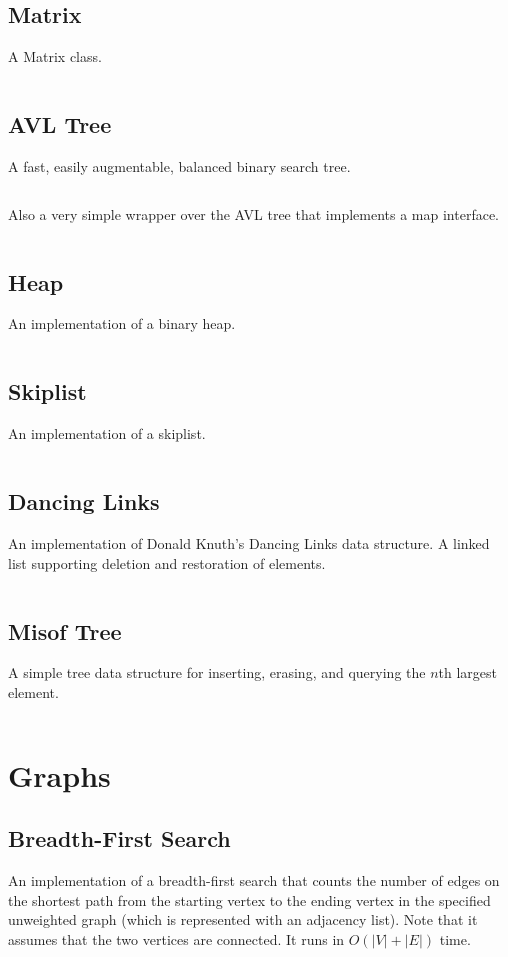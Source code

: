 \documentclass[9pt,a4paper,twocolumn,landscape,oneside]{amsart}
\newcommand{\code}[1]{\inputminted{cpp}{_code/#1}}
\begin{document}
    \subsection{Matrix}
        A Matrix class.
        \code{data-structures/matrix.cpp}

    \subsection{AVL Tree}
        A fast, easily augmentable, balanced binary search tree.
        \code{data-structures/avl_tree.cpp}

        Also a very simple wrapper over the AVL tree that implements a map
        interface.
        \code{data-structures/avl_map.cpp}

    \subsection{Heap}
        An implementation of a binary heap.
        \code{data-structures/heap.cpp}

    \subsection{Skiplist}
        An implementation of a skiplist.
        \code{data-structures/skiplist.cpp}

    \subsection{Dancing Links}
        An implementation of Donald Knuth's Dancing Links data structure. A
        linked list supporting deletion and restoration of elements.
        \code{data-structures/dancing_links.cpp}

    \subsection{Misof Tree}
        A simple tree data structure for inserting, erasing, and querying the $n$th largest element.
        \code{data-structures/misof_tree.cpp}

\section{Graphs}
    \subsection{Breadth-First Search}
        An implementation of a breadth-first search that counts the number of
        edges on the shortest path from the starting vertex to the ending
        vertex in the specified unweighted graph (which is represented with an
        adjacency list). Note that it assumes that the two vertices are
        connected. It runs in $O(|V|+|E|)$ time.
        \code{graph/bfs.cpp}
\end{document}

